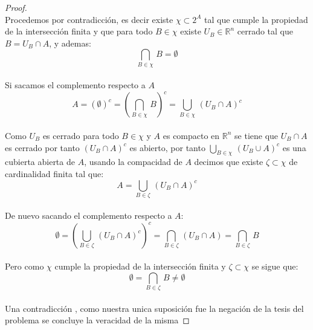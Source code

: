 \documentclass[11pt,letterpaper]{article}
\newcommand{\R}{\mathbb{R}}
\begin{document}
\begin{proof}\,\\
    Procedemos por contradicci\'on, es decir existe $\chi\subset2^A$ tal que cumple la propiedad de la intersecci\'on finita y que para todo $B\in \chi$ existe $U_B\in \R^n$ cerrado tal que $B=U_B\cap A$, y ademas:\,\\
    \begin{equation*}
      \bigcap_{B\in \chi}\,B=\emptyset
    \end{equation*}\,\\
    Si sacamos el complemento respecto a $A$\,\\
    \begin{equation*}
      A=(\emptyset)^c=\left(\bigcap_{B\in \chi}\,B\right)^c=\bigcup_{B\in \chi}\,(U_B\cap A)^c
    \end{equation*}\,\\
    Como $U_B$ es cerrado para todo $B\in \chi$ y $A$ es compacto en $\R^n$ se tiene que $U_B\cap A$ es cerrado por tanto $(U_B\cap A)^c$ es abierto, por tanto $\displaystyle \bigcup_{B\in \chi}\,(U_B\cup A)^c$ es una cubierta abierta de $A$, usando la compacidad de $A$ decimos que existe
    $\zeta\subset \chi$ de cardinalidad finita tal que:\,\\
    \begin{equation*}
      A=\bigcup_{B\in \zeta}\,(U_B\cap A)^c
    \end{equation*}\,\\
    De nuevo sacando el complemento respecto a $A$:\,\\
    \begin{equation*}
      \emptyset=\left(\bigcup_{B\in \zeta}\,(U_B\cap A)^c\right)^c=\bigcap_{B\in \zeta}\,(U_B\cap A)=\bigcap_{B\in \zeta}\,B
    \end{equation*}\,\\
    Pero como $\chi$ cumple la propiedad de la intersecci\'on finita y $\zeta\subset\chi$ se sigue que:\,\\
    \begin{equation*}
      \emptyset=\bigcap_{B\in \zeta}\,B\neq \emptyset
    \end{equation*}\,\\
    Una contradicci\'on , como nuestra unica suposici\'on fue la negaci\'on de la tesis del problema se concluye la veracidad de la misma
   

\end{proof}
\end{document}
